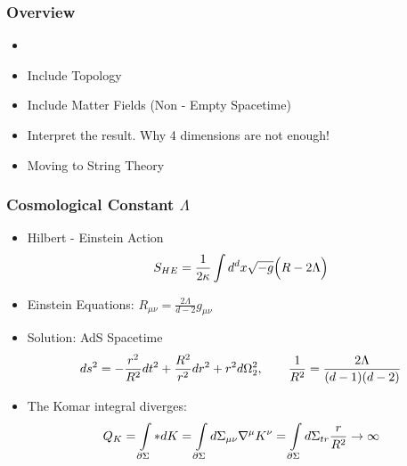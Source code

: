 \documentclass[t]{beamer}
\begin{document}

\begin{frame}
\frametitle{Overview}

\begin{itemize}
\setlength{\parskip}{10pt}
\item {}
\item Include Topology
\item Include Matter Fields (Non - Empty Spacetime)
\item Interpret the result. Why 4 dimensions are not enough!
\item Moving to String Theory
\end{itemize}
\end{frame}



\begin{frame}
\frametitle{Cosmological Constant $\Lambda$}

\begin{itemize}
\setlength{\parskip}{10pt}
\item<1-> Hilbert - Einstein Action
\begin{align}
S_{HE} = \frac{1}{2\kappa} \int d^dx \sqrt{-g} \Big( R - 2\Lambda \Big) \notag
\end{align}

\item<2-> Einstein Equations: $R_{\mu\nu} = \frac{2\Lambda}{d-2} g_{\mu\nu}$

\item<3-> Solution: AdS Spacetime 
\begin{align}
ds^2 = - \frac{r^2}{R^2} dt^2 + \frac{R^2}{r^2} dr^2 + r^2 d\Omega^2_2, \qquad \frac{1}{R^2} = \frac{2\Lambda}{(d-1)(d-2)}  \notag
\end{align}

\item<4-> The Komar integral diverges:
\begin{align}
Q_{K} = \int\limits_{\partial\Sigma}*dK = \int\limits_{\partial\Sigma} d\Sigma_{\mu\nu} \nabla^\mu K^\nu = \int\limits_{\partial\Sigma} d\Sigma_{tr} \frac{r}{R^2} \rightarrow \infty  \notag
\end{align}

\end{itemize}
\end{frame}

\end{document}
